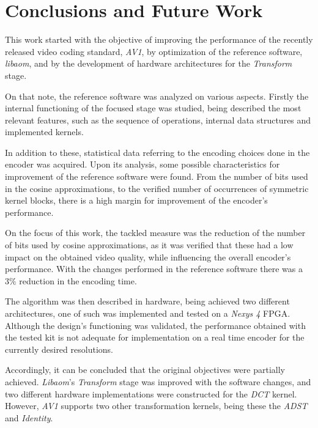 \cleardoublepage
\chapter{Conclusions and Future Work}


This work started with the objective of improving the performance of the recently released video coding standard, \emph{AV1}, by optimization of the reference software, \emph{libaom}, and by the development of hardware architectures for the \emph{Transform} stage.

On that note, the reference software was analyzed on various aspects. Firstly the internal functioning of the focused stage was studied, being described the most relevant features, such as the sequence of operations, internal data structures and implemented kernels.

In addition to these, statistical data referring to the encoding choices done in the encoder was acquired. Upon its analysis, some possible characteristics for improvement of the reference software were found. From the number of bits used in the cosine approximations, to the verified number of occurrences of symmetric kernel blocks, there is a high margin for improvement of the encoder's performance.

On the focus of this work, the tackled measure was the reduction of the number of bits used by cosine approximations, as it was verified that these had a low impact on the obtained video quality, while influencing the overall encoder's performance. With the changes performed in the reference software there was a $3\%$ reduction in the encoding time.

The algorithm was then described in hardware, being achieved two different architectures, one of such was implemented and tested on a \emph{Nexys 4} FPGA. Although the design's functioning was validated, the  performance obtained with the tested kit is not adequate for implementation on a real time encoder for the currently desired resolutions.

Accordingly, it can be concluded that the original objectives were partially achieved. \emph{Libaom}'s \emph{Transform} stage was improved with the software changes, and two different hardware implementations were constructed for the \emph{DCT} kernel. However, \emph{AV1} supports two other transformation kernels, being these the \emph{ADST} and \emph{Identity}. 

